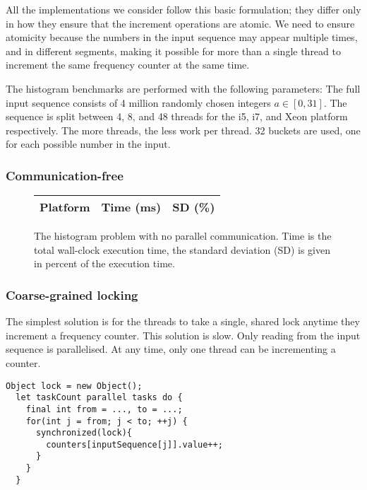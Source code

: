 All the implementations we consider follow this basic formulation; they differ
only in how they ensure that the increment operations are atomic. We need to
ensure atomicity because the numbers in the input sequence may appear multiple
times, and in different segments, making it possible for more than a single
thread to increment the same frequency counter at the same time.

The histogram benchmarks are performed with the following parameters: The full
input sequence consists of 4 million randomly chosen integers $a\in[0,31]$. The
sequence is split between 4, 8, and 48 threads for the i5, i7, and Xeon platform
respectively. The more threads, the less work per thread. 32 buckets are used,
one for each possible number in the input.

\subsubsection{Communication-free}
\begin{figure}[hbtp]
	\centering
	\begin{tabular}{l r r}
		\hline
		\hline
		Platform & Time (ms) & SD (\%) \\
		\hline
		
		\hline
		\hline
	\end{tabular}
	\caption{The histogram problem with no parallel communication. Time is
	the total wall-clock execution time, the standard deviation (SD) is
	given in percent of the execution time.}
	\label{table:histo-lockfree}
\end{figure}


\subsubsection{Coarse-grained locking}
The simplest solution is for the threads to take a single, shared lock anytime
they increment a frequency counter. This solution is slow. Only reading
from the input sequence is parallelised. At any time,
only one thread can be incrementing a counter.

\begin{code}
\begin{Verbatim}[frame=single]
  Object lock = new Object();
  let taskCount parallel tasks do {
    final int from = ..., to = ...;
    for(int j = from; j < to; ++j) {
      synchronized(lock){
        counters[inputSequence[j]].value++;
      }
    }
  }
\end{Verbatim}
	\caption{Simplified code for the threads in the coarse-grained locking
	version of the histogram problem.}
\end{code}

